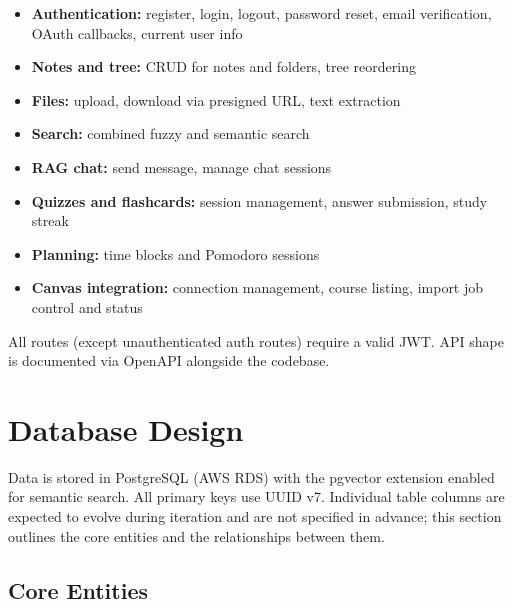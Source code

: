 \documentclass[12pt,a4paper]{article}
\begin{document}
\begin{itemize}
    \item \textbf{Authentication:} register, login, logout, password reset, email verification, OAuth callbacks, current user info
    \item \textbf{Notes and tree:} CRUD for notes and folders, tree reordering
    \item \textbf{Files:} upload, download via presigned URL, text extraction
    \item \textbf{Search:} combined fuzzy and semantic search
    \item \textbf{RAG chat:} send message, manage chat sessions
    \item \textbf{Quizzes and flashcards:} session management, answer submission, study streak
    \item \textbf{Planning:} time blocks and Pomodoro sessions
    \item \textbf{Canvas integration:} connection management, course listing, import job control and status
\end{itemize}

All routes (except unauthenticated auth routes) require a valid JWT. API shape is documented via OpenAPI alongside the codebase.

\section{Database Design}

Data is stored in PostgreSQL (AWS RDS) with the pgvector extension enabled for semantic search. All primary keys use UUID v7. Individual table columns are expected to evolve during iteration and are not specified in advance; this section outlines the core entities and the relationships between them.

\subsection{Core Entities}
\end{document}

